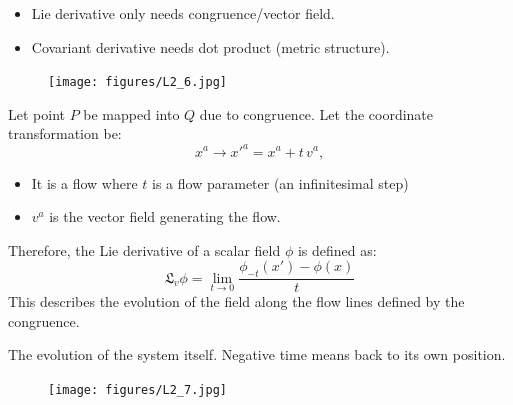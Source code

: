 \documentclass[14pt]{article} %
\begin{document}
\begin{itemize}
    \item Lie derivative only needs congruence/vector field.
    \item Covariant derivative needs dot product (metric structure).
\end{itemize}
\begin{figure}[H]
\centering
\texttt{[image: figures/L2\_6.jpg]}
\caption*{}
\end{figure}
\vspace{-1cm}
Let point $P$ be mapped into $Q$ due to congruence. Let the coordinate transformation be:
\[
x^a \rightarrow x'^a = x^a + t \,v^a,
\]
\begin{itemize}
    \item It is a flow where $t$ is a flow parameter (an infinitesimal step)
    \item $v^a$ is the vector field generating the flow.
\end{itemize}
Therefore, the Lie derivative of a scalar field $\phi$ is defined as:
\[
\boxed{\mathfrak{L}_v \phi = \lim_{t \to 0} \frac{\phi_{-t}(x') - \phi(x)}{t}}
\]
\noindent This describes the evolution of the field along the flow lines defined by the congruence.
\begin{tcolorbox}[proofbox, title=Note: Why $\phi_{-t}(x')~?$]
The evolution of the system itself. Negative time means back to its own position.
\begin{figure}[H]
\centering
\texttt{[image: figures/L2\_7.jpg]}
\caption*{}
\end{figure}
\vspace{-1cm}
\end{tcolorbox}
\end{document}
